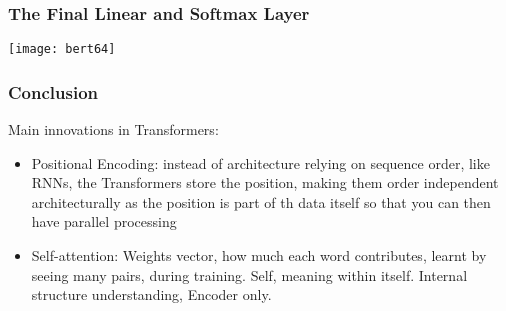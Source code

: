 \begin{frame}[fragile]\frametitle{The Final Linear and Softmax Layer}


			\begin{center}
			\texttt{[image: bert64]}
			\end{center}		

			
\end{frame}

\begin{frame}[fragile]\frametitle{Conclusion}

Main innovations in Transformers:
\begin{itemize}
\item Positional Encoding: instead of architecture relying on sequence order, like RNNs, the Transformers store the position, making them order independent architecturally as the position is part of th data itself so that you can then have parallel processing
\item Self-attention: Weights vector, how much each word contributes, learnt by seeing many pairs, during training. Self, meaning within itself. Internal structure understanding, Encoder only.

			\end{itemize}
			
\end{frame}



			
